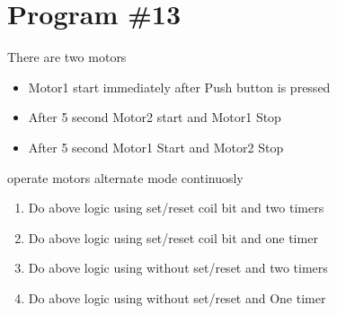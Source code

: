\documentclass[
	12pt, %
]{fphw}
\begin{document}
\section*{Program \#13}                                                                    
  \begin{problem}
    There are two motors
    \medskip
   \begin{itemize}
    \item Motor1 start immediately after Push button is pressed
    \item After 5 second Motor2 start and Motor1 Stop
    \item After 5 second Motor1 Start and Motor2 Stop
    \end{itemize}
    operate motors alternate mode continuosly
    \begin{enumerate}
    \item Do above logic using set/reset coil bit and two timers
    \item Do above logic using set/reset coil bit and one timer
    \item Do above logic using without set/reset and two timers
    \item Do above logic using without set/reset and One timer
      \end{enumerate}
  \end{problem}
\end{document}
